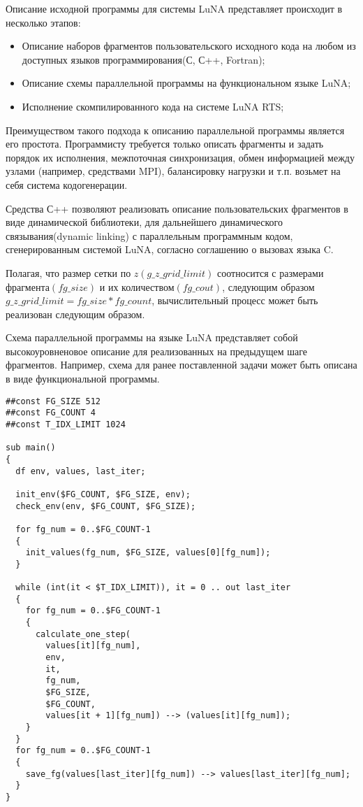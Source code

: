 Описание исходной программы для системы LuNA представляет происходит в несколько этапов:

\begin{itemize}
    \item Описание наборов фрагментов пользовательского исходного кода
на любом из доступных языков программирования(С, С++, Fortran);
    \item Описание схемы параллельной программы на функциональном языке LuNA;
    \item Исполнение скомпилированного кода на системе LuNA RTS;
\end{itemize}

Преимуществом такого подхода к описанию параллельной программы является его простота. Программисту
требуется только описать фрагменты и задать порядок их исполнения, межпоточная синхронизация, обмен информацией между узлами
(например, средствами MPI), балансировку нагрузки и т.п. возьмет на себя система кодогенерации.

Средства С++ позволяют реализовать описание пользовательских фрагментов в виде динамической библиотеки,
для дальнейшего динамического связывания(dynamic linking) с параллельным программным кодом, сгенерированным системой LuNA,
согласно соглашению о вызовах языка C.

Полагая, что размер сетки по $z(g\_z\_grid\_limit)$ соотносится с размерами фрагмента$(fg\_size)$ и их количеством$(fg\_cout)$,
следующим образом $g\_z\_grid\_limit = fg\_size * fg\_count$, вычислительный процесс может быть реализован следующим образом.


Схема параллельной программы на языке LuNA представляет собой высокоуровненовое описание для реализованных на предыдущем шаге фрагментов.
Например, схема для ранее поставленной задачи может быть описана в виде функциональной программы.

\begin{lstlisting}[style={CppCodeStyle}]
##const FG_SIZE 512
##const FG_COUNT 4
##const T_IDX_LIMIT 1024

sub main()
{
  df env, values, last_iter;

  init_env($FG_COUNT, $FG_SIZE, env);
  check_env(env, $FG_COUNT, $FG_SIZE);

  for fg_num = 0..$FG_COUNT-1
  {
    init_values(fg_num, $FG_SIZE, values[0][fg_num]);
  }

  while (int(it < $T_IDX_LIMIT)), it = 0 .. out last_iter
  {
    for fg_num = 0..$FG_COUNT-1
    {
      calculate_one_step(
        values[it][fg_num],
        env,
        it,
        fg_num,
        $FG_SIZE,
        $FG_COUNT,
        values[it + 1][fg_num]) --> (values[it][fg_num]);
    }
  }
  for fg_num = 0..$FG_COUNT-1
  {
  	save_fg(values[last_iter][fg_num]) --> values[last_iter][fg_num];
  }
}
\end{lstlisting}

